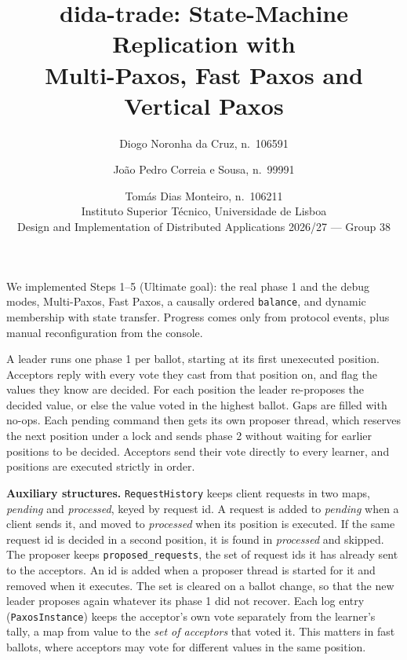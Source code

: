 \documentclass[times, 10pt,twocolumn]{article}
\begin{document}
\title{dida-trade: State-Machine Replication with\\Multi-Paxos, Fast Paxos and Vertical Paxos}

\author{Diogo Noronha da Cruz, n.\textordmasculine~106591 \and Jo\~ao Pedro Correia e Sousa, n.\textordmasculine~99991 \and Tom\'as Dias Monteiro, n.\textordmasculine~106211\\
Instituto Superior T\'ecnico, Universidade de Lisboa\\
Design and Implementation of Distributed Applications 2026/27 --- Group 38
}

\maketitle
\thispagestyle{empty}


We implemented Steps 1--5 (Ultimate goal): the real phase 1 and the debug
modes, Multi-Paxos, Fast Paxos, a causally ordered \texttt{balance}, and
dynamic membership with state transfer. Progress comes only from protocol
events, plus manual reconfiguration from the console.


A leader runs one phase 1 per ballot, starting at its first unexecuted
position. Acceptors reply with every vote they cast from that position on,
and flag the values they know are decided. For each position the leader
re-proposes the decided value, or else the value voted in the highest ballot.
Gaps are filled with no-ops. Each pending command then gets its own proposer
thread, which reserves the next position under a lock and sends phase 2
without waiting for earlier positions to be decided. Acceptors send their
vote directly to every learner, and positions are executed strictly in order.

\textbf{Auxiliary structures.} \texttt{RequestHistory} keeps client requests
in two maps, \emph{pending} and \emph{processed}, keyed by request id. A
request is added to \emph{pending} when a client sends it, and moved to
\emph{processed} when its position is executed. If the same request id is
decided in a second position, it is found in \emph{processed} and skipped. The
proposer keeps \texttt{proposed\_requests}, the set of request ids it has
already sent to the acceptors. An id is added when a proposer thread is
started for it and removed when it executes. The set is cleared on a ballot
change, so that the new leader proposes again whatever its phase 1 did not
recover. Each log entry (\texttt{PaxosInstance}) keeps the acceptor's own
vote separately from the learner's tally, a map from value to the
\emph{set of acceptors} that voted it. This matters in fast ballots, where
acceptors may vote for different values in the same position.
\end{document}
